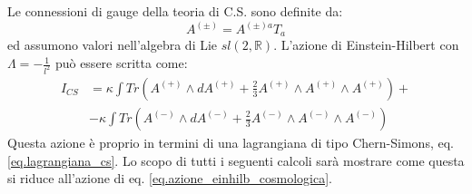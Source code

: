 Le connessioni di gauge della teoria di C.S. sono definite da:
\begin{equation}
    A^{(\pm)} = A^{(\pm)a} T_a
    \label{eq.connessione_gauge_cs_gravità3d}
\end{equation}
ed assumono valori nell'algebra di Lie $sl(2,\mathbb R)$. L'azione di Einstein-Hilbert con $\Lambda = - \frac{1}{l^2}$ può essere scritta come:
\begin{align}
    I_{CS} &= \kappa \int Tr(A^{(+)} \wedge dA^{(+)} + \frac{2}{3}A^{(+)}\wedge A^{(+)} \wedge A^{(+)}) + \nonumber \\ &- \kappa \int Tr(A^{(-)} \wedge dA^{(-)} + \frac{2}{3}A^{(-)}\wedge A^{(-)} \wedge A^{(-)})
    \label{eq.azione_einhilb_cs}
\end{align}
Questa azione è proprio in termini di una lagrangiana di tipo Chern-Simons, eq. \ref{eq.lagrangiana_cs}. Lo scopo di tutti i seguenti calcoli sarà mostrare come questa si riduce all'azione di eq. \ref{eq.azione_einhilb_cosmologica}.

